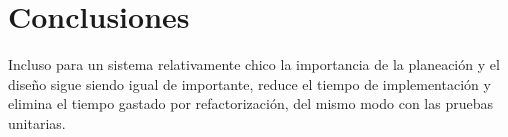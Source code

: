 \documentclass[a4paper]{article}
\begin{document}
%
\section*{Conclusiones}
Incluso para un sistema relativamente chico la importancia de la planeaci\'on y el diseño  sigue siendo igual de importante, reduce el tiempo de implementaci\'on y elimina el tiempo gastado por refactorizaci\'on, del mismo modo con las pruebas unitarias.   \\



{}

\end{document}

